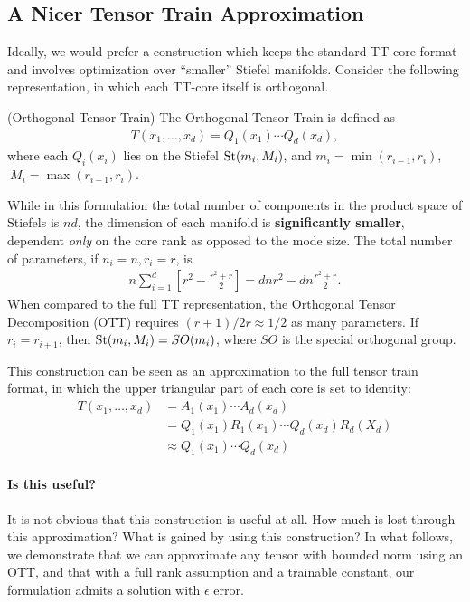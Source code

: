 \subsection{A Nicer Tensor Train Approximation}
Ideally, we would prefer a construction which keeps the standard TT-core format and involves optimization over ``smaller'' Stiefel manifolds. Consider the following representation, in which each TT-core itself is orthogonal.
\begin{definition}\label{def:ott}(Orthogonal Tensor Train)
The Orthogonal Tensor Train is defined as
\begin{align}
T(x_1,\ldots,x_d) = Q_1(x_1) \cdots Q_d(x_d),
\end{align}
where each $Q_i(x_i)$ lies on the Stiefel $\text{St}(m_i, M_i)$, and $m_i = \min(r_{i-1},r_i)$, $\ M_i = \max(r_{i-1},r_i)$.
\end{definition}
While in this formulation the total number of components in the product space of Stiefels is $nd$, the dimension of each manifold is \textbf{significantly smaller},
dependent {\em only} on the core rank as opposed to the mode size.
The total number of parameters, if $n_i =n, r_i = r$, is
\begin{align}
n \sum_{i=1}^d \left[ r^2 - \frac{r^2 + r}{2}\right] = d n r^2 - dn\frac{r^2 + r}{2}.
\end{align}
When compared to the full TT representation,
the Orthogonal Tensor Decomposition (OTT) requires
$(r+1)/2r \approx 1/2$ as many parameters.
If $r_i=r_{i+1}$, then $\text{St}(m_i, M_i) = SO(m_i)$, where $SO$ is the special orthogonal group.

This construction can be seen as an approximation to the full tensor train format, in which the upper triangular part of each core is set to identity:
\begin{align}
    T(x_1,\ldots,x_d) &= A_1(x_1)\cdots A_d(x_d) \nonumber\\ &= Q_1(x_1)R_1(x_1)\cdots Q_d(x_d)R_d(X_d) \nonumber\\
    &\approx Q_1(x_1) \cdots Q_d(x_d)
\end{align}

\paragraph{Is this useful?} It is not obvious that this construction is useful at all. How much is lost through this approximation? What is gained by using this construction? In what follows, we demonstrate that we can approximate any tensor with bounded norm using an OTT, and that with a full rank assumption and a trainable constant, our formulation admits a solution with $\epsilon$ error.

